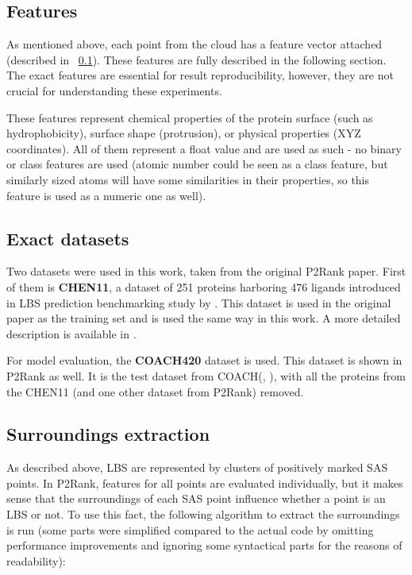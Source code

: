 \subsection{Features}
\label{features_section}

As mentioned above, each point from the cloud has a feature vector attached (described in ~\ref{features_section}). These features are fully described in the following section. The exact features are essential for result reproducibility, however, they are not crucial for understanding these experiments. 

These features represent chemical properties of the protein surface (such as hydrophobicity), surface shape (protrusion), or physical properties (XYZ coordinates). All of them represent a float value and are used as such - no binary or class features are used (atomic number could be seen as a class feature, but similarly sized atoms will have some similarities in their properties, so this feature is used as a numeric one as well).

\subsection{Exact datasets}

Two datasets were used in this work, taken from the original P2Rank paper. First of them is \textbf{CHEN11}, a dataset of 251 proteins harboring 476 ligands introduced in LBS prediction benchmarking study by \cite{chen11}. This dataset is used in the original paper as the training set and is used the same way in this work. A more detailed description is available in \cite{chen11}.

For model evaluation, the \textbf{COACH420} dataset is used. This dataset is shown in P2Rank as well. It is the test dataset from COACH(\cite{coach1}, \cite{coach2}), with all the proteins from the CHEN11 (and one other dataset from P2Rank) removed. 

\subsection{Surroundings extraction}
\label{Surroundings}

As described above, LBS are represented by clusters of positively marked SAS points. In P2Rank, features for all points are evaluated individually, but it makes sense that the surroundings of each SAS point influence whether a point is an LBS or not. To use this fact, the following algorithm to extract the surroundings is run (some parts were simplified compared to the actual code by omitting performance improvements and ignoring some syntactical parts for the reasons of readability):

